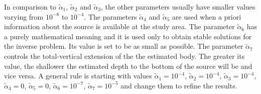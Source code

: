 In comparison to $\tilde{\alpha}_1$, $\tilde{\alpha}_2$ and $\tilde{\alpha}_3$,
the other parameters usually have smaller values varying from $10^{-8}$ to $10^{-4}$.
The parameters $\tilde{\alpha}_4$ and $\tilde{\alpha}_5$ are used when a priori
information about the source is available at the study area.
The parameter $\tilde{\alpha}_6$ has a purely mathematical meaning and it is 
used only to obtain stable solutions for the inverse problem.
Its value is set to be as small as possible.
The parameter $\tilde{\alpha}_7$ controls the total-vertical extension of the 
the estimated body. 
The greater its value, the shallower the estimated depth to the bottom of the source will be 
and vice versa.
A general rule is starting with values 
$\tilde{\alpha}_1 = 10^{-4}$, $\tilde{\alpha}_2 = 10^{-4}$, $\tilde{\alpha}_3 = 10^{-4}$,
$\tilde{\alpha}_4 = 0$, $\tilde{\alpha}_5 = 0$, $\tilde{\alpha}_6 = 10^{-7}$, 
$\tilde{\alpha}_7 = 10^{-5}$ and change them to refine the results.



